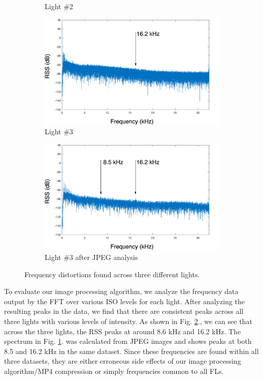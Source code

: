 \documentclass[conference]{IEEEtran}
\begin{document}
\begin{figure}[!h]
\begin{subfigure}{.245\textwidth}
		\caption{Light \#2}
	\end{subfigure}
	\begin{subfigure}{.245\textwidth}
		\centering
		\includegraphics[width=1\linewidth]{figures/A/light_3_16_2.png}
		\caption{Light \#3}
	\end{subfigure}
	\begin{subfigure}{.245\textwidth}
		\centering
		\includegraphics[width=1\linewidth]{figures/B/light_2_8_6_16_2_jpegs.png}
		\caption{Light \#3 after JPEG analysis}
		\label{fig:frequencydistortions_jpeg}
	\end{subfigure}
	\caption{Frequency distortions found across three different lights.}
	\label{fig:frequencydistortions}
\end{figure}

To evaluate our image processing algorithm, we analyze the frequency data output by the FFT over various ISO levels for each light. After analyzing the resulting peaks in the data, we find that there are consistent peaks across all three lights with various levels of intensity. As shown in Fig. \ref{fig:frequencydistortions}., we can see that across the three lights, the RSS peaks at around 8.6 kHz and 16.2 kHz. The spectrum in Fig. \ref{fig:frequencydistortions_jpeg}. was calculated from JPEG images and shows peaks at both 8.5 and 16.2 kHz in the same dataset. Since these frequencies are found within all three datasets, they are either erroneous side effects of our image processing algorithm/MP4 compression or simply frequencies common to all FLs.
\end{document}

